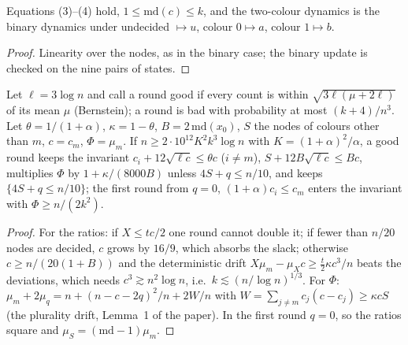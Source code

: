 \begin{theorem}[Model]\label{thm:pmodel}
\leanok
Equations (3)--(4) hold, $1\le\mathrm{md}(c)\le k$, and the two-colour dynamics is the binary
dynamics under undecided $\mapsto u$, colour $0\mapsto a$, colour $1\mapsto b$.
\end{theorem}
\begin{proof}\leanok
Linearity over the nodes, as in the binary case; the binary update is checked on the nine pairs
of states.
\end{proof}

\begin{lemma}\label{lem:pgood}
\leanok{}
Let $\ell=3\log n$ and call a round good if every count is within
$\sqrt{3\ell(\mu+2\ell)}$ of its mean $\mu$ (Bernstein); a round is bad with probability at most
$(k+4)/n^3$. Let $\theta=1/(1+\alpha)$, $\kappa=1-\theta$, $B=2\,\mathrm{md}(x_0)$, $S$ the nodes
of colours other than $m$, $c=c_m$, $\Phi=\mu_m$. If $n\ge 2\cdot10^{12}K^2k^3\log n$ with
$K=(1+\alpha)^2/\alpha$, a good round keeps the invariant
$c_i+12\sqrt{\ell c}\le\theta c$ ($i\ne m$), $S+12B\sqrt{\ell c}\le Bc$, multiplies $\Phi$ by
$1+\kappa/(8000B)$ unless $4S+q\le n/10$, and keeps $\{4S+q\le n/10\}$; the first round from
$q=0$, $(1+\alpha)c_i\le c_m$ enters the invariant with $\Phi\ge n/(2k^2)$.
\end{lemma}
\begin{proof}\leanok
For the ratios: if $X\le tc/2$ one round cannot double it; if fewer than $n/20$ nodes are
decided, $c$ grows by $16/9$, which absorbs the slack; otherwise $c\ge n/(20(1+B))$ and the
deterministic drift $X\mu_m-\mu_Xc\ge\frac t2\kappa c^3/n$ beats the deviations, which needs
$c^3\gtrsim n^2\log n$, i.e.\ $k\lesssim(n/\log n)^{1/3}$. For $\Phi$:
$\mu_m+2\mu_q=n+(n-c-2q)^2/n+2W/n$ with $W=\sum_{j\ne m}c_j(c-c_j)\ge\kappa cS$ (the plurality
drift, Lemma~1 of the paper). In the first round $q=0$, so the ratios square and
$\mu_S=(\mathrm{md}-1)\mu_m$.
\end{proof}

